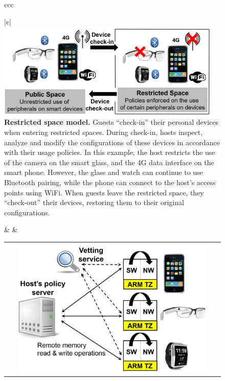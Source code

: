 \begin{figure}[t!]
\centering
\begin{tabular}{ccc}
\begin{minipage}{0.46\textwidth}
\centering
\begin{tabular}{|c|}
\hline
\indent\vspace{-0.0cm}\\
\includegraphics[keepaspectratio=true,width=0.95\textwidth]{figures/restricted-space.png}\\
{\small {\bf Restricted space model.} Guests ``check-in'' their personal
devices when entering restricted spaces. During check-in, hosts inspect,
analyze and modify the configurations of these devices in accordance with their
usage policies. In this example, the host restricts the use of the camera on
the smart glass, and the 4G data interface on the smart phone. However, the
glass and watch can continue to use Bluetooth pairing, while the phone can
connect to the host's access points using WiFi.  When guests leave the
restricted space, they ``check-out'' their devices, restoring them to their
original configurations.}\\
\hline
\end{tabular}
\end{minipage} & & 
\begin{minipage}{0.46\textwidth}
\centering
\begin{tabular}{|c|}
\hline
\indent\vspace{-0.2cm}\\
\includegraphics[keepaspectratio=true,width=0.90\textwidth]{figures/host-guest.png}\\

\end{tabular}
\end{minipage}
\end{tabular}
\end{figure}
